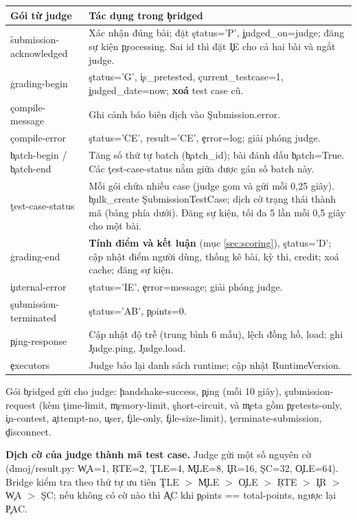 \begin{center}\small
\begin{longtable}{@{}L{3.9cm}L{9.0cm}@{}}
\toprule
Gói từ judge & Tác dụng trong \c{bridged} \\
\midrule
\endhead
\f{submission-acknowledged} & Xác nhận đúng bài; đặt \c{status='P'}, \c{judged_on=judge}; đăng sự kiện \c{processing}. Sai id thì đặt \c{IE} cho cả hai bài và ngắt judge. \\
\c{grading-begin} & \c{status='G'}, \c{is_pretested}, \c{current_testcase=1}, \c{judged_date=now}; \textbf{xoá} test case cũ. \\
\c{compile-message} & Ghi cảnh báo biên dịch vào \c{Submission.error}. \\
\c{compile-error} & \c{status='CE'}, \c{result='CE'}, \c{error=log}; giải phóng judge. \\
\c{batch-begin} / \c{batch-end} & Tăng số thứ tự batch (\c{batch_id}); bài đánh dấu \c{batch=True}. Các \c{test-case-status} nằm giữa được gán số batch này. \\
\c{test-case-status} & Mỗi gói chứa nhiều case (judge gom và gửi mỗi 0,25 giây). \c{bulk_create} \c{SubmissionTestCase}; dịch cờ trạng thái thành mã (bảng phía dưới). Đăng sự kiện, tối đa 5 lần mỗi 0,5 giây cho một bài. \\
\c{grading-end} & \textbf{Tính điểm và kết luận} (mục \ref{sec:scoring}), \c{status='D'}; cập nhật điểm người dùng, thống kê bài, kỳ thi, credit; xoá cache; đăng sự kiện. \\
\c{internal-error} & \c{status='IE'}, \c{error=message}; giải phóng judge. \\
\c{submission-terminated} & \c{status='AB'}, \c{points=0}. \\
\c{ping-response} & Cập nhật độ trễ (trung bình 6 mẫu), lệch đồng hồ, \c{load}; ghi \c{Judge.ping}, \c{Judge.load}. \\
\c{executors} & Judge báo lại danh sách runtime; cập nhật \c{RuntimeVersion}. \\
\bottomrule
\end{longtable}
\end{center}
Gói \c{bridged} gửi cho judge: \c{handshake-success}, \c{ping} (mỗi 10 giây), \c{submission-request} (kèm \c{time-limit}, \c{memory-limit}, \c{short-circuit}, và \c{meta} gồm \c{pretests-only}, \c{in-contest}, \c{attempt-no}, \c{user}, \c{file-only}, \c{file-size-limit}), \c{terminate-submission}, \c{disconnect}. \tS

\textbf{Dịch cờ của judge thành mã test case.} Judge gửi một số nguyên cờ (\f{dmoj/result.py}: \c{WA}=1, \c{RTE}=2, \c{TLE}=4, \c{MLE}=8, \c{IR}=16, \c{SC}=32, \c{OLE}=64). Bridge kiểm tra theo thứ tự ưu tiên \c{TLE} $>$ \c{MLE} $>$ \c{OLE} $>$ \c{RTE} $>$ \c{IR} $>$ \c{WA} $>$ \c{SC}; nếu không có cờ nào thì \c{AC} khi \c{points == total-points}, ngược lại \c{PAC}. \tS

